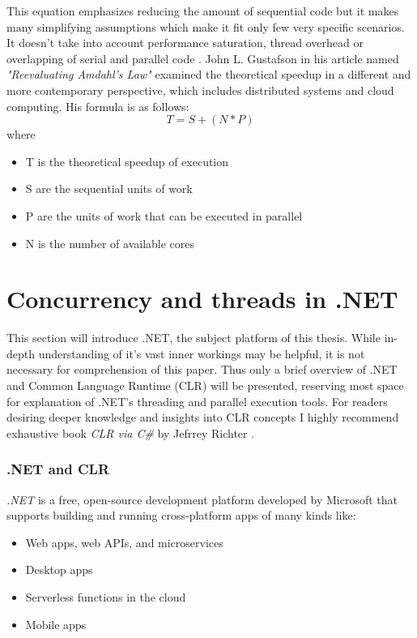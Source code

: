 This equation emphasizes reducing the amount of sequential code but it makes many simplifying assumptions which make it fit only few very specific scenarios. It doesn't take into account performance saturation, thread overhead or overlapping of serial and parallel code \cite{Popov2010}.
John L. Gustafson in his article named \emph{"Reevaluating Amdahl's Law"} \cite{Gustafson1988} examined the theoretical speedup in a different and more contemporary perspective, which includes distributed systems and cloud computing. His formula is as follows: 
\begin{equation}
T = S + (N*P)
\end{equation}
where
\begin{itemize}
	\item T is the theoretical speedup of execution
	\item S are the sequential units of work
	\item P are the units of work that can be executed in parallel
	\item N is the number of available cores
\end{itemize}

\clearpage
\section{Concurrency and threads in .NET}
This section will introduce .NET, the subject platform of this thesis. While in-depth understanding of it's vast inner workings may be helpful, it is not necessary for comprehension of this paper. Thus only a brief overview of .NET and Common Language Runtime (CLR) will be presented, reserving most space for explanation of .NET's threading and parallel execution tools. For readers desiring deeper knowledge and insights into CLR concepts I highly recommend exhaustive book \emph{CLR via C\#} by Jefrrey Richter \cite{richter}.

\subsubsection{.NET and CLR}
\emph{.NET} is a free, open-source development platform developed by Microsoft that supports building and running cross-platform apps of many kinds like:
\begin{itemize}
	\item Web apps, web APIs, and microservices
	\item Desktop apps
	\item Serverless functions in the cloud
	\item Mobile apps
\end{itemize}

